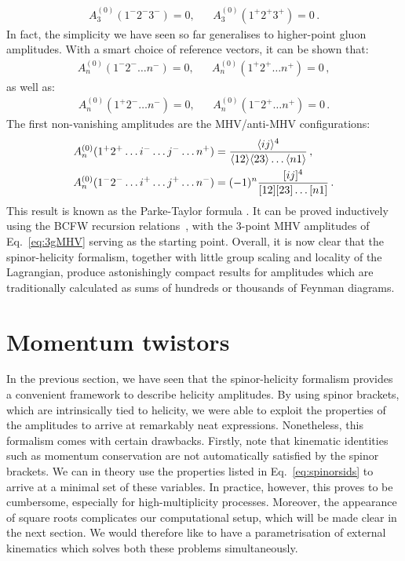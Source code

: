 \documentclass[main.tex]{subfiles}
\begin{document}
\begin{align}
    A_3^{(0)} (1^-2^-3^-) = 0, && A_3^{(0)} (1^+2^+3^+) = 0\,.
\end{align}
In fact, the simplicity we have seen so far generalises to higher-point gluon amplitudes. With a smart choice of reference vectors, it can be shown that:
\begin{align}
    A_n^{(0)} (1^-2^- \ldots n^-) = 0, && A_n^{(0)} (1^+2^+ \ldots n^+) = 0\,,
\end{align}
as well as:
\begin{align}
    A_n^{(0)} (1^+2^- \ldots n^-) = 0, && A_n^{(0)} (1^-2^+ \ldots n^+) = 0\,.
\end{align}
The first non-vanishing amplitudes are the MHV/anti-MHV configurations:
\begin{align} \label{eq:ParkeTaylor}
    A_n^{(0)} (1^+2^+\ldots i^- \ldots j^- \ldots n^+) &= \frac{\langle ij \rangle^4}{\langle 12 \rangle \langle 23 \rangle \ldots \langle n1 \rangle} \,, \\
    A_n^{(0)} (1^-2^-\ldots i^+ \ldots j^+ \ldots n^-) &= (-1)^n \frac{[ ij ]^4}{[ 12 ] [ 23 ] \ldots [ n1 ]} \,.
\end{align}
This result is known as the Parke-Taylor formula \cite{parketaylor, Mangano:1990by}. It can be proved inductively using the BCFW recursion relations~\cite{Britto:2004ap, Britto:2005fq}, with the 3-point MHV amplitudes of Eq.~\ref{eq:3gMHV} serving as the starting point. Overall, it is now clear that the spinor-helicity formalism, together with little group scaling and locality of the Lagrangian, produce astonishingly compact results for amplitudes which are traditionally calculated as sums of hundreds or thousands of Feynman diagrams.
\section{Momentum twistors} \label{sec:MTs}
In the previous section, we have seen that the spinor-helicity formalism provides a convenient framework to describe helicity amplitudes. By using spinor brackets, which are intrinsically tied to helicity, we were able to exploit the properties of the amplitudes to arrive at remarkably neat expressions. Nonetheless, this formalism comes with certain drawbacks. Firstly, note that kinematic identities such as momentum conservation are not automatically satisfied by the spinor brackets. We can in theory use the properties listed in Eq.~\ref{eq:spinorsids} to arrive at a minimal set of these variables. In practice, however, this proves to be cumbersome, especially for high-multiplicity processes. Moreover, the appearance of square roots complicates our computational setup, which will be made clear in the next section. We would therefore like to have a parametrisation of external kinematics which solves both these problems simultaneously.
\end{document}
